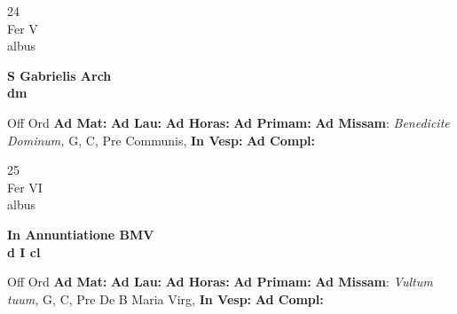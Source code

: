 \documentclass[10pt, openany]{book}
\begin{document}
    \begin{center}
        \begin{minipage}{3.5in}
            \vspace{2em}
            \begin{minipage}{0.5in}
                {\Huge 24} \\
                {\normalsize Fer V} \\
                {\normalsize albus}
            \end{minipage}
            \begin{minipage}{3.0in}
                \textbf{ \large S Gabrielis Arch \\
                \textnormal{\normalsize dm}} \\ 
            \end{minipage}
            \begin{justify}Off Ord
                \textbf{Ad Mat: }
                \textbf{Ad Lau: }
                \textbf{Ad Horas: }
                \textbf{Ad Primam: }\textbf{Ad Missam}: \textit{Benedicite Dominum,} G, C, Pre Communis,  
                \textbf{In Vesp: }
                \textbf{Ad Compl: }
            \end{justify}
        \end{minipage}
    \end{center}

    \begin{center}
        \begin{minipage}{3.5in}
            \vspace{2em}
            \begin{minipage}{0.5in}
                {\Huge 25} \\
                {\normalsize Fer VI} \\
                {\normalsize albus}
            \end{minipage}
            \begin{minipage}{3.0in}
                \textbf{ \large In Annuntiatione BMV \\
                \textnormal{\normalsize d I cl}} \\ 
            \end{minipage}
            \begin{justify}Off Ord
                \textbf{Ad Mat: }
                \textbf{Ad Lau: }
                \textbf{Ad Horas: }
                \textbf{Ad Primam: }\textbf{Ad Missam}: \textit{Vultum tuum,} G, C, Pre De B Maria Virg,  
                \textbf{In Vesp: }
                \textbf{Ad Compl: }
            \end{justify}
        \end{minipage}
    \end{center}
\end{document}

